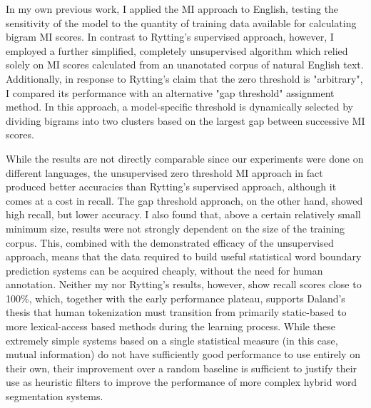 In my own previous work\cite{kearsley14}, I applied the MI approach to English, testing the sensitivity of the model to the quantity of training data available for calculating bigram MI scores. In contrast to Rytting's supervised approach, however, I employed a further simplified, completely unsupervised algorithm which relied solely on MI scores calculated from an unanotated corpus of natural English text. Additionally, in response to Rytting's claim that the zero threshold is "arbitrary", I compared its performance with an alternative "gap threshold" assignment method. In this approach, a model-specific threshold is dynamically selected by dividing bigrams into two clusters based on the largest gap between successive MI scores.

While the results are not directly comparable since our experiments were done on different languages, the unsupervised zero threshold MI approach in fact produced better accuracies than Rytting's supervised approach\cite{rytting04}, although it comes at a cost in recall. The gap threshold approach, on the other hand, showed high recall, but lower accuracy. I also found that, above a certain relatively small minimum size, results were not strongly dependent on the size of the training corpus. This, combined with the demonstrated efficacy of the unsupervised
approach, means that the data required to build useful statistical word boundary prediction
systems can be acquired cheaply, without the need for human annotation. Neither my nor Rytting's results, however, show recall scores close to 100\%, which, together with the early performance plateau, supports Daland's thesis that human tokenization must transition from primarily static-based to more lexical-access based methods during the learning process. While these extremely simple systems based on a single statistical measure (in this case, mutual information) do not have sufficiently good performance to use entirely on their own, their improvement over a
random baseline is sufficient to justify their use as heuristic filters to improve the performance of more complex hybrid word segmentation systems\cite{kearsley14}.

